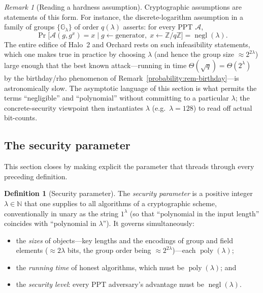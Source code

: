 \documentclass[11pt,a4paper]{article}
\theoremstyle{definition}
\newtheorem{definition}[theorem]{Definition}
\theoremstyle{remark}
\newtheorem{remark}[theorem]{Remark}
\newcommand{\N}{\ensuremath{\mathbb{N}}}
\newcommand{\Z}{\ensuremath{\mathbb{Z}}}
\newcommand{\G}{\ensuremath{\mathbb{G}}}
\DeclareMathOperator{\negl}{negl}
\DeclareMathOperator{\poly}{poly}
\newcommand{\Adv}{\ensuremath{\mathcal{A}}}
\begin{document}
\begin{remark}[Reading a hardness assumption]\label{probability:rem-hardness}
Cryptographic assumptions are statements of this form. For instance, the discrete-logarithm assumption in a family of groups \(\{\G_\lambda\}\) of order \(q(\lambda)\) asserts: for every PPT \(\Adv\),
\[
\Pr\Big[\Adv(g, g^{x}) = x \;\Big|\; g \leftarrow \text{generator},\; x \leftarrow \Z/q\Z\Big] = \negl(\lambda).
\]
The entire edifice of Halo~2 and Orchard rests on such infeasibility statements, which one makes true in practice by choosing \(\lambda\) (and hence the group size \(\approx 2^{2\lambda}\)) large enough that the best known attack---running in time \(\Theta(\sqrt{q}) = \Theta(2^{\lambda})\) by the birthday/rho phenomenon of Remark~\ref{probability:rem-birthday}---is astronomically slow. The asymptotic language of this section is what permits the terms ``negligible'' and ``polynomial'' without committing to a particular \(\lambda\); the concrete-security viewpoint then instantiates \(\lambda\) (e.g.\ \(\lambda = 128\)) to read off actual bit-counts.
\end{remark}

\subsection{The security parameter}\label{probability:sub-secparam}

This section closes by making explicit the parameter that threads through every preceding definition.

\begin{definition}[Security parameter]\label{probability:def-secparam}
The \emph{security parameter} is a positive integer \(\lambda \in \N\) that one supplies to all algorithms of a cryptographic scheme, conventionally in unary as the string \(1^\lambda\) (so that ``polynomial in the input length'' coincides with ``polynomial in \(\lambda\)''). It governs simultaneously:
\begin{itemize}
\item the \emph{sizes} of objects---key lengths and the encodings of group and field elements (\(\approx 2\lambda\) bits, the group order being \(\approx 2^{2\lambda}\))---each \(\poly(\lambda)\);
\item the \emph{running time} of honest algorithms, which must be \(\poly(\lambda)\); and
\item the \emph{security level}: every PPT adversary's advantage must be \(\negl(\lambda)\).
\end{itemize}
\end{definition}
\end{document}
